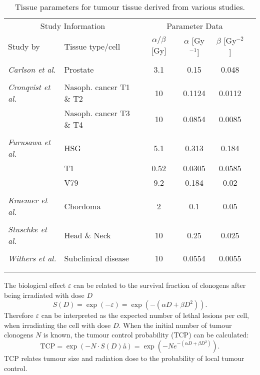 \begin{table}[tbh]
\centering
\small
\begin{tabular}{llcccc}
\toprule
\multicolumn{2}{c}{Study Information} & \multicolumn{3}{c}{Parameter Data} \\
\cmidrule(r){1-2} \cmidrule(r){3-5}
Study by & Tissue type/cell & $\alpha/\beta$ [Gy] & $\alpha$ [Gy$^{-1}$] & $\beta$ [Gy$^{-2}$]\\
\midrule\\
\textit{Carlson et al.}\cite{pmid18363426}& Prostate & 3.1 & 0.15 & 0.048\\\\
\textit{Cronqvist et al.}\cite{CronqvistThesis}& Nasoph. cancer T1 \& T2 & 10 & 0.1124 & 0.0112\\
& Nasoph. cancer T3 \& T4 &10 & 0.0854 & 0.0085\\\\
\textit{Furusawa et al.}\cite{pmid11025645}& HSG & 5.1 & 0.313 & 0.184\\
& T1 &0.52 & 0.0305 & 0.0585\\
& V79 &9.2 & 0.184 & 0.02\\\\
\textit{Kraemer et al.}\cite{pmid11098906}& Chordoma & 2 & 0.1 & 0.05\\\\
\textit{Stuschke et al.}\cite{pmid10435801}& Head \& Neck & 10 & 0.25 & 0.025\\\\
\textit{Withers et al.}\cite{pmid7836089}& Subclinical disease & 10 & 0.0554 & 0.0055\\\\
\bottomrule\\
\end{tabular}
\caption{Tissue parameters for tumour tissue derived from various studies.}
\label{tab:tumortissueparameter}
\end{table}
The biological effect $\varepsilon$ can be related to the survival fraction of clonogens after being irradiated with dose $D$
\begin{equation}
S(D) = \exp(-\varepsilon) = \exp(-(\alpha D + \beta D^2)).
\end{equation}
Therefore $\varepsilon$ can be interpreted as the expected number of lethal lesions per cell, when irradiating the cell with dose $D$. When the initial number of tumour clonogens $N$ is known, the tumour control probability (TCP) can be calculated:
\begin{equation}
\mathrm{TCP} = \exp(-N\cdot S(D)å) = \exp\left(-Ne^{-(\alpha D + \beta D^2)}\right).
\end{equation}
TCP relates tumour size and radiation dose to the probability of local tumour control.
